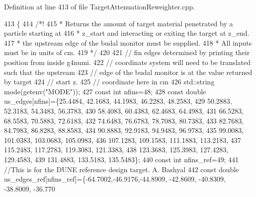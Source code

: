 Definition at line 413 of file Target\-Attenuation\-Reweighter.\-cpp.


\begin{DoxyCode}
413                                                                                                          \{\textcolor{comment}{}
414 \textcolor{comment}{    /*!}
415 \textcolor{comment}{     * Returns the amount of target material penetrated by a particle starting at}
416 \textcolor{comment}{     * z\_start and interacting or exiting the target at z\_end.}
417 \textcolor{comment}{     * the upstream edge of the budal monitor must be supplied.}
418 \textcolor{comment}{     * All inputs must be in units of cm.}
419 \textcolor{comment}{     */}
420 
421     \textcolor{comment}{// fin edges determined by printing their position from inside g4numi. }
422     \textcolor{comment}{// coordinate system will need to be translated such that the upstream}
423     \textcolor{comment}{// edge of the budal monitor is at the value returned by target}
424     \textcolor{comment}{// start z.}
425     \textcolor{comment}{// coordinate here in cm}
426     std::string mode(getenv(\textcolor{stringliteral}{"MODE"}));
427     \textcolor{keyword}{const} \textcolor{keywordtype}{int} nfins=48;
428     \textcolor{keyword}{const} \textcolor{keywordtype}{double} us\_edges[nfins]=\{25.4484,   42.1683,   44.1983,   46.2283, 48.2583,
429                                   50.2883,   52.3183,   54.3483,   56.3783,
430                                   58.4083,   60.4383,   62.4683,   64.4983,
431                                   66.5283,   68.5583,   70.5883,   72.6183,
432                                   74.6483,   76.6783,   78.7083,   80.7383,
433                                   82.7683,   84.7983,   86.8283,   88.8583,
434                                   90.8883,   92.9183,   94.9483,   96.9783,
435                                   99.0083,  101.0383,  103.0683,  105.0983,
436                                   107.1283, 109.1583,  111.1883,  113.2183,
437                                   115.2483, 117.2783,  119.3083,  121.3383,
438                                   123.3683, 125.3983,  127.4283,  129.4583,
439                                   131.4883, 133.5183,  135.5483\};
440     \textcolor{keyword}{const} \textcolor{keywordtype}{int} nfins\_ref=49;
441     \textcolor{comment}{//This is for the DUNE reference design target. A. Bashyal                            }
442     \textcolor{keyword}{const} \textcolor{keywordtype}{double} us\_edges\_ref[nfins\_ref]=\{-64.7002,-46.9176,-44.8909, -42.8609, -40.8309, -38.8009, -36.770

\end{DoxyCode}
